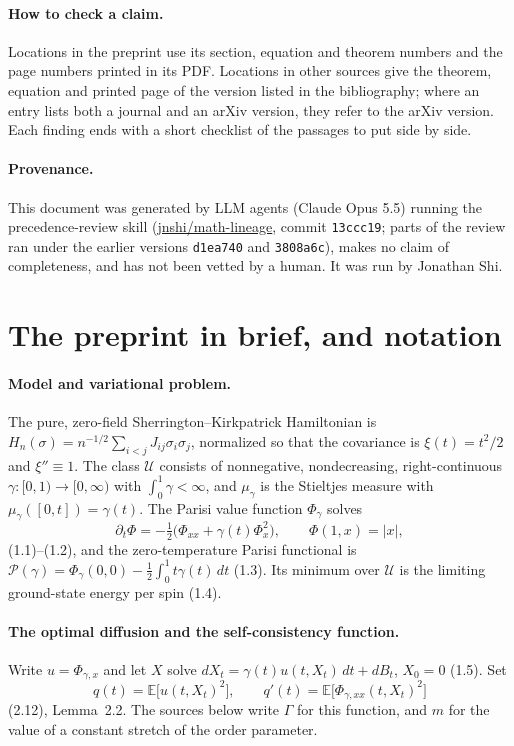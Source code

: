 \documentclass[11pt]{article}
\newcommand{\E}{\mathbb{E}}
\newcommand{\ploc}[2]{#1}
\newcounter{finding}
\begin{document}
\paragraph{How to check a claim.}
Locations in the preprint use its section,
equation and theorem numbers and the page numbers printed in its PDF.
Locations in other sources give the theorem, equation and printed page of the
version listed in the bibliography; where an entry lists both a journal and an
arXiv version, they refer to the arXiv version. Each finding ends with a short checklist
of the passages to put side by side.

\paragraph{Provenance.}
This document was generated by LLM agents (Claude Opus 5.5) running the
precedence-review skill
(\href{https://github.com/jnshi/math-lineage/tree/13ccc19ec/.agents/skills/precedence-review}{jnshi/math-lineage},
commit \texttt{13ccc19}; parts of the review ran under the earlier versions
\texttt{d1ea740} and \texttt{3808a6c}), makes no claim of completeness, and
has not been vetted by a human. It was run by Jonathan Shi.
\space%
\section{The preprint in brief, and notation}\label{sec:overview}

\paragraph{Model and variational problem.}
The pure, zero-field Sherrington--Kirkpatrick Hamiltonian is
$H_n(\sigma)=n^{-1/2}\sum_{i<j}J_{ij}\sigma_i\sigma_j$, normalized so that the
covariance is $\xi(t)=t^2/2$ and $\xi''\equiv1$. The class $\mathcal U$
consists of nonnegative, nondecreasing, right-continuous
$\gamma:[0,1)\to[0,\infty)$ with $\int_0^1\gamma<\infty$, and $\mu_\gamma$ is
the Stieltjes measure with $\mu_\gamma([0,t])=\gamma(t)$. The Parisi value
function $\Phi_\gamma$ solves
\[
 \partial_t\Phi=-\tfrac12\bigl(\Phi_{xx}+\gamma(t)\Phi_x^2\bigr),
 \qquad \Phi(1,x)=|x|,
\]
\ploc{(1.1)--(1.2)}{main.tex:65--78}, and the zero-temperature Parisi
functional is $\mathcal P(\gamma)=\Phi_\gamma(0,0)-\frac12\int_0^1t\gamma(t)\,dt$
\ploc{(1.3)}{main.tex:82--85}. Its minimum over $\mathcal U$ is the limiting
ground-state energy per spin \ploc{(1.4)}{main.tex:100--103}.

\paragraph{The optimal diffusion and the self-consistency function.}
Write $u=\Phi_{\gamma,x}$ and let $X$ solve
$dX_t=\gamma(t)u(t,X_t)\,dt+dB_t$, $X_0=0$ \ploc{(1.5)}{main.tex:109--113}. Set
\[
 q(t)=\E\bigl[u(t,X_t)^2\bigr],\qquad q'(t)=\E\bigl[\Phi_{\gamma,xx}(t,X_t)^2\bigr]
\]
\ploc{(2.12), Lemma~2.2}{regularity.tex:189--208}. The sources below write
$\Gamma$ for this function, and $m$ for the value of a constant stretch of the
order parameter.
\end{document}
